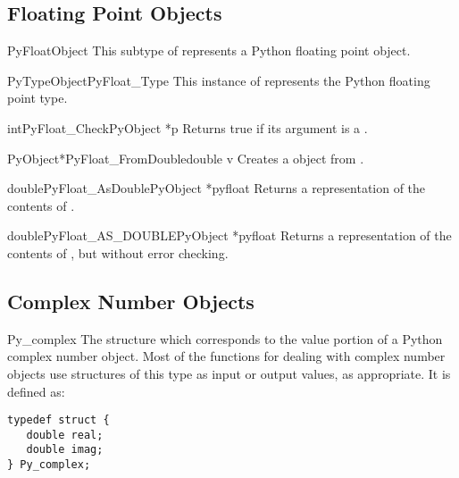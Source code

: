 \documentclass{manual}
\begin{document}
\subsection{Floating Point Objects \label{floatObjects}}

\begin{ctypedesc}{PyFloatObject}
This subtype of  represents a Python floating point
object.
\end{ctypedesc}

\begin{cvardesc}{PyTypeObject}{PyFloat_Type}
This instance of  represents the Python floating
point type.
\end{cvardesc}

\begin{cfuncdesc}{int}{PyFloat_Check}{PyObject *p}
Returns true if its argument is a .
\end{cfuncdesc}

\begin{cfuncdesc}{PyObject*}{PyFloat_FromDouble}{double v}
Creates a  object from .
\end{cfuncdesc}

\begin{cfuncdesc}{double}{PyFloat_AsDouble}{PyObject *pyfloat}
Returns a \C{}  representation of the contents of .
\end{cfuncdesc}

\begin{cfuncdesc}{double}{PyFloat_AS_DOUBLE}{PyObject *pyfloat}
Returns a \C{}  representation of the contents of
, but without error checking.
\end{cfuncdesc}


\subsection{Complex Number Objects \label{complexObjects}}

\begin{ctypedesc}{Py_complex}
The \C{} structure which corresponds to the value portion of a Python
complex number object.  Most of the functions for dealing with complex
number objects use structures of this type as input or output values,
as appropriate.  It is defined as:

\begin{verbatim}
typedef struct {
   double real;
   double imag;
} Py_complex;
\end{verbatim}
\end{ctypedesc}
\end{document}
